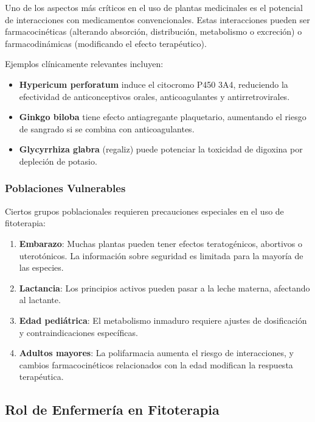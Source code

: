 \documentclass[12pt,a4paper]{article}
\begin{document}
Uno de los aspectos más críticos en el uso de plantas medicinales es el potencial de interacciones con medicamentos convencionales. Estas interacciones pueden ser farmacocinéticas (alterando absorción, distribución, metabolismo o excreción) o farmacodinámicas (modificando el efecto terapéutico)\cite{Izzo2016}.

Ejemplos clínicamente relevantes incluyen:

\begin{itemize}
    \item \textbf{Hypericum perforatum} induce el citocromo P450 3A4, reduciendo la efectividad de anticonceptivos orales, anticoagulantes y antirretrovirales\cite{Henderson2002}.
    \item \textbf{Ginkgo biloba} tiene efecto antiagregante plaquetario, aumentando el riesgo de sangrado si se combina con anticoagulantes\cite{Bent2005}.
    \item \textbf{Glycyrrhiza glabra} (regaliz) puede potenciar la toxicidad de digoxina por depleción de potasio\cite{Williamson2013}.
\end{itemize}

\subsubsection{Poblaciones Vulnerables}

Ciertos grupos poblacionales requieren precauciones especiales en el uso de fitoterapia:

\begin{enumerate}
    \item \textbf{Embarazo}: Muchas plantas pueden tener efectos teratogénicos, abortivos o uterotónicos. La información sobre seguridad es limitada para la mayoría de las especies\cite{Holst2009}.
    \item \textbf{Lactancia}: Los principios activos pueden pasar a la leche materna, afectando al lactante\cite{Dante2013}.
    \item \textbf{Edad pediátrica}: El metabolismo inmaduro requiere ajustes de dosificación y contraindicaciones específicas\cite{Lanski2003}.
    \item \textbf{Adultos mayores}: La polifarmacia aumenta el riesgo de interacciones, y cambios farmacocinéticos relacionados con la edad modifican la respuesta terapéutica\cite{Tachjian2010}.
\end{enumerate}

\subsection{Rol de Enfermería en Fitoterapia}
\end{document}
